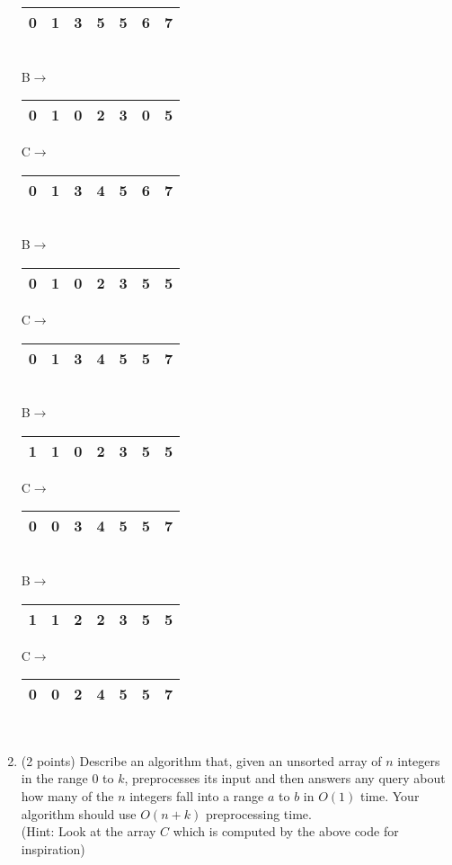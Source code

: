 \documentclass[12pt]{elsart}
\begin{document}
\begin{enumerate}
\begin{tabular}{|l|l|l|l|l|l|l|}
   	0 & 1 & 3 & 5 & 5 & 6 & 7\\
   	\hline
   \end{tabular}\\
   B$\rightarrow$\begin{tabular}{|l|l|l|l|l|l|l|}
	  \hline
	  0 & 1 & 0 & 2 & 3 & 0 & 5\\
	  \hline
   \end{tabular}
   C$\rightarrow$\begin{tabular}{|l|l|l|l|l|l|l|}
	  \hline
	  0 & 1 & 3 & 4 & 5 & 6 & 7\\
	  \hline
   \end{tabular}\\
   B$\rightarrow$\begin{tabular}{|l|l|l|l|l|l|l|}
     \hline
     0 & 1 & 0 & 2 & 3 & 5 & 5\\
     \hline
   \end{tabular}
   C$\rightarrow$\begin{tabular}{|l|l|l|l|l|l|l|}
     \hline
     0 & 1 & 3 & 4 & 5 & 5 & 7\\
     \hline
   \end{tabular}\\
   B$\rightarrow$\begin{tabular}{|l|l|l|l|l|l|l|}
     \hline
     1 & 1 & 0 & 2 & 3 & 5 & 5\\
     \hline
   \end{tabular}
   C$\rightarrow$\begin{tabular}{|l|l|l|l|l|l|l|}
     \hline
     0 & 0 & 3 & 4 & 5 & 5 & 7\\
     \hline
   \end{tabular}\\
   B$\rightarrow$\begin{tabular}{|l|l|l|l|l|l|l|}
     \hline
     1 & 1 & 2 & 2 & 3 & 5 & 5\\
     \hline
   \end{tabular}
   C$\rightarrow$\begin{tabular}{|l|l|l|l|l|l|l|}
     \hline
     0 & 0 & 2 & 4 & 5 & 5 & 7\\
     \hline
   \end{tabular}\\

   \item (2 points) Describe an algorithm that, given an unsorted array of $n$ integers in the range $0$ to $k$, preprocesses its
input and then answers any query about how many of the $n$ integers fall into a range $a$ to $b$ in $O(1)$ time. Your algorithm should use $O(n+k)$ preprocessing time.
\\(Hint: Look at the array $C$ which is computed by the above code for inspiration)


\end{enumerate}
\end{document}
